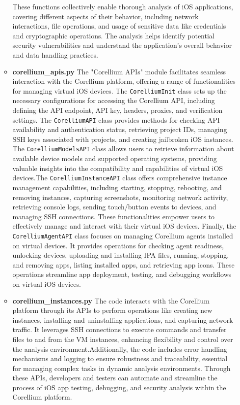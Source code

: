 \documentclass{report}
\begin{document}
\begin{itemize}
\begin{itemize}
        These functions collectively enable thorough analysis of iOS applications, covering different aspects of their behavior, including network interactions, file operations, and usage of sensitive data like credentials and cryptographic operations. The analysis helps identify potential security vulnerabilities and understand the application's overall behavior and data handling practices.

        \item \textbf{corellium\_apis.py}
         The "Corellium APIs" module facilitates seamless interaction with the Corellium platform, offering a range of functionalities for managing virtual iOS devices. The \texttt{CorelliumInit} class sets up the necessary configurations for accessing the Corellium API, including defining the API endpoint, API key, headers, proxies, and verification settings. The \texttt{CorelliumAPI} class provides methods for checking API availability and authentication status, retrieving project IDs, managing SSH keys associated with projects, and creating jailbroken iOS instances. The \texttt{CorelliumModelsAPI} class allows users to retrieve information about available device models and supported operating systems, providing valuable insights into the compatibility and capabilities of virtual iOS devices.The \texttt{CorelliumInstanceAPI} class offers comprehensive instance management capabilities, including starting, stopping, rebooting, and removing instances, capturing screenshots, monitoring network activity, retrieving console logs, sending touch/button events to devices, and managing SSH connections. These functionalities empower users to effectively manage and interact with their virtual iOS devices. Finally, the \texttt{CorelliumAgentAPI} class focuses on managing Corellium agents installed on virtual devices. It provides operations for checking agent readiness, unlocking devices, uploading and installing IPA files, running, stopping, and removing apps, listing installed apps, and retrieving app icons. These operations streamline app deployment, testing, and debugging workflows on virtual iOS devices.

         \item \textbf{corellium\_instances.py}
         The code interacts with the Corellium platform through its APIs to perform operations like creating new instances, installing and uninstalling applications, and capturing network traffic. It leverages SSH connections to execute commands and transfer files to and from the VM instances, enhancing flexibility and control over the analysis environment.Additionally, the code includes error handling mechanisms and logging to ensure robustness and traceability, essential for managing complex tasks in dynamic analysis environments. Through these APIs, developers and testers can automate and streamline the process of iOS app testing, debugging, and security analysis within the Corellium platform.


\end{itemize}
\end{itemize}
\end{document}
